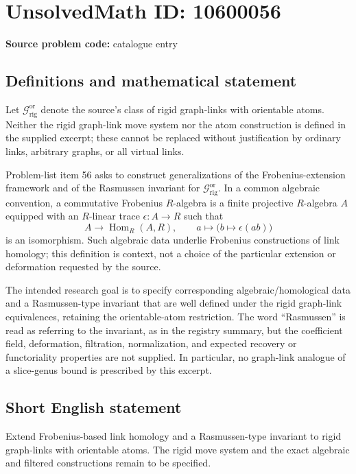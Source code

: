 \documentclass[11pt]{article}
\begin{document}
\section*{UnsolvedMath ID: 10600056}
\textbf{Source problem code:} catalogue entry
\subsection{Definitions and mathematical statement}
Let $\mathcal G_{\mathrm{rig}}^{\mathrm{or}}$ denote the source's class of rigid graph-links with orientable atoms. Neither the rigid graph-link move system nor the atom construction is defined in the supplied excerpt; these cannot be replaced without justification by ordinary links, arbitrary graphs, or all virtual links.

Problem-list item 56 asks to construct generalizations of the Frobenius-extension framework and of the Rasmussen invariant for $\mathcal G_{\mathrm{rig}}^{\mathrm{or}}$. In a common algebraic convention, a commutative Frobenius $R$-algebra is a finite projective $R$-algebra $A$ equipped with an $R$-linear trace $\epsilon:A\to R$ such that
\[
 A\longrightarrow\operatorname{Hom}_R(A,R),\qquad
 a\longmapsto\bigl(b\longmapsto\epsilon(ab)\bigr)
\]
is an isomorphism. Such algebraic data underlie Frobenius constructions of link homology; this definition is context, not a choice of the particular extension or deformation requested by the source.

The intended research goal is to specify corresponding algebraic/homological data and a Rasmussen-type invariant that are well defined under the rigid graph-link equivalences, retaining the orientable-atom restriction. The word ``Rasmussen'' is read as referring to the invariant, as in the registry summary, but the coefficient field, deformation, filtration, normalization, and expected recovery or functoriality properties are not supplied. In particular, no graph-link analogue of a slice-genus bound is prescribed by this excerpt.
\subsection{Short English statement}
Extend Frobenius-based link homology and a Rasmussen-type invariant to rigid graph-links with orientable atoms. The rigid move system and the exact algebraic and filtered constructions remain to be specified.
\end{document}
